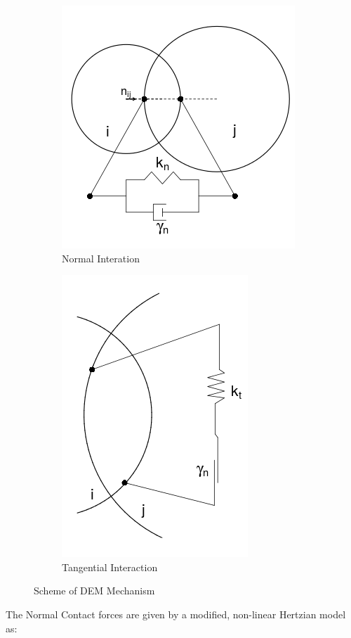 \begin{figure}[htb!]
 \begin{subfigure}{.5\textwidth}
  \centering
    \includegraphics[width=\linewidth]{figures/normal_interaction.png} 
    \caption{{\small{Normal Interation}}}
 \end{subfigure}
 \begin{subfigure}{.5\textwidth}
  \centering
    \includegraphics[width=.69\linewidth]{figures/tangential_interaction.png}
    \caption{{\small{Tangential Interaction}}}
     \end{subfigure}
 \caption{Scheme of DEM Mechanism}
 \label{fig:dem_mechanism}
\end{figure}
\newpage
The Normal Contact forces are given by a modified, non-linear Hertzian model as:

